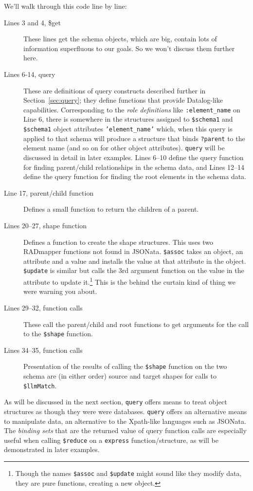 \documentclass[10pt,letterpaper]{article} %
\newcommand{\stt}[1]{\texttt{#1}} %
\begin{document}
We'll walk through this code line by line:
\begin{description}
\item[Lines 3 and 4, \$get]
  These lines get the schema objects, which are big, contain lots of information superfluous to our goals.
  So we won't discuss them further here.
\item[Lines 6-14, query]
  These are definitions of query constructs described further in Section~\ref{sec:query};
  they define functions that provide Datalog-like capabilities.
  Corresponding to the \textit{role definitions} like \stt{:element\_name} on Line 6, there is somewhere in the structures assigned to \stt{\$schema1} and \stt{\$schema1}
  object attributes \stt{'element\_name'} which, when this query is applied to that schema will produce a structure that binds \stt{?parent} to the element name (and so on for other object attributes).
  \stt{query} will be discussed in detail in later examples.
  Lines 6--10 define the query function for finding parent/child relationships in the schema data, and
  Lines 12--14 define the query function for finding the root elements in the schema data.
\item[Line 17, parent/child function] Defines a small function to return the children of a parent.
\item[Lines 20--27, shape function] Defines a function to create the shape structures.
  This uses two RADmapper functions not found in JSONata.
  \stt{\$assoc} takes an object, an attribute and a value and installs the value at that attribute in the object.
  \stt{\$update} is similar but calls the 3rd argument function on the value in the attribute to update it.\footnote{
    Though the names  \stt{\$assoc} and  \stt{\$update} might sound like they modify data, they are pure functions, creating a new object.} This is the behind the curtain kind of thing we were warning you about.
\item[Lines 29--32, function calls] These call the parent/child and root functions to get arguments for the call to the \stt{\$shape} function.
\item[Lines 34--35, function calls] Presentation of the results of calling the \stt{\$shape} function on the two schema are (in either order)
  source and target shapes for calls to \stt{\$llmMatch}.
\end{description}

As will be discussed in the next section, \stt{query} offers means to treat object structures as though they were were databases.
\stt{query} offers an alternative means to manipulate data, an alternative to the Xpath-like languages such as JSONata.
The \textit{binding sets} that are the returned value of query function calls are especially useful when calling \stt{\$reduce} on a \stt{express} function/structure, as will be demonstrated in later examples.
\end{document}
